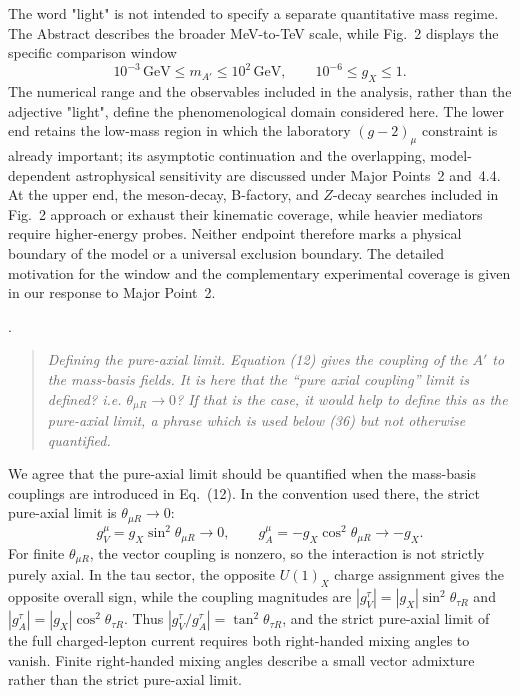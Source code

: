 \documentclass[12pt,a4paper]{article}
\begin{document}
The word "light" is not intended to specify a separate quantitative mass regime. The Abstract describes the broader MeV-to-TeV scale, while Fig.~2 displays the specific comparison window
\[
10^{-3}\,\mathrm{GeV}\leq m_{A'}\leq10^2\,\mathrm{GeV},
\qquad
10^{-6}\leq g_X\leq1.
\]
The numerical range and the observables included in the analysis, rather than the adjective "light", define the phenomenological domain considered here. The lower end retains the low-mass region in which the laboratory \((g-2)_\mu\) constraint is already important; its asymptotic continuation and the overlapping, model-dependent astrophysical sensitivity are discussed under Major Points~2 and~4.4. At the upper end, the meson-decay, B-factory, and \(Z\)-decay searches included in Fig.~2 approach or exhaust their kinematic coverage, while heavier mediators require higher-energy probes. Neither endpoint therefore marks a physical boundary of the model or a universal exclusion boundary. The detailed motivation for the window and the complementary experimental coverage is given in our response to Major Point~2.

\medskip
{}.
\begin{quote}\itshape
Defining the pure-axial limit. Equation (12) gives the coupling of the \(A'\) to the mass-basis fields. It is here that the ``pure axial coupling'' limit is defined? i.e. \(\theta_{\mu R}\to0\)? If that is the case, it would help to define this as the pure-axial limit, a phrase which is used below (36) but not otherwise quantified.
\end{quote}


We agree that the pure-axial limit should be quantified when the mass-basis couplings are introduced in Eq.~(12). In the convention used there, the strict pure-axial limit is \(\theta_{\mu R}\to0\):
\[
g_V^\mu=g_X\sin^2\theta_{\mu R}\to0,
\qquad
g_A^\mu=-g_X\cos^2\theta_{\mu R}\to-g_X.
\]
For finite \(\theta_{\mu R}\), the vector coupling is nonzero, so the interaction is not strictly purely axial. In the tau sector, the opposite \(U(1)_X\) charge assignment gives the opposite overall sign, while the coupling magnitudes are \(|g_V^\tau|=|g_X|\sin^2\theta_{\tau R}\) and \(|g_A^\tau|=|g_X|\cos^2\theta_{\tau R}\). Thus \(\left|g_V^\tau/g_A^\tau\right|=\tan^2\theta_{\tau R}\), and the strict pure-axial limit of the full charged-lepton current requires both right-handed mixing angles to vanish. Finite right-handed mixing angles describe a small vector admixture rather than the strict pure-axial limit.
\end{document}
